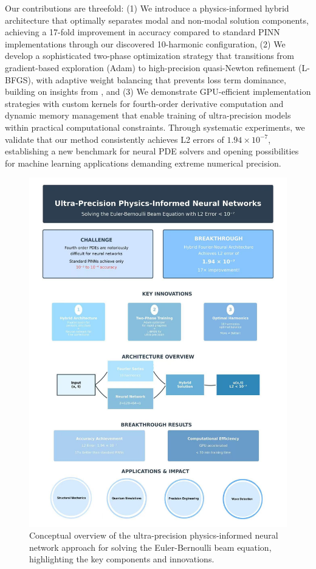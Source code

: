 Our contributions are threefold: (1) We introduce a physics-informed hybrid architecture that optimally separates modal and non-modal solution components, achieving a 17-fold improvement in accuracy compared to standard PINN implementations through our discovered 10-harmonic configuration, (2) We develop a sophisticated two-phase optimization strategy that transitions from gradient-based exploration (Adam) to high-precision quasi-Newton refinement (L-BFGS), with adaptive weight balancing that prevents loss term dominance, building on insights from \cite{penwarden2023unified}, and (3) We demonstrate GPU-efficient implementation strategies with custom kernels for fourth-order derivative computation and dynamic memory management that enable training of ultra-precision models within practical computational constraints. Through systematic experiments, we validate that our method consistently achieves L2 errors of $1.94 \times 10^{-7}$, establishing a new benchmark for neural PDE solvers and opening possibilities for machine learning applications demanding extreme numerical precision.

\begin{figure}[ht]
    \centering
    \includegraphics[width = 1.0\linewidth]{figures/infographic.png}
    \caption{Conceptual overview of the ultra-precision physics-informed neural network approach for solving the Euler-Bernoulli beam equation, highlighting the key components and innovations.}
    \label{fig:infographic}
\end{figure}

